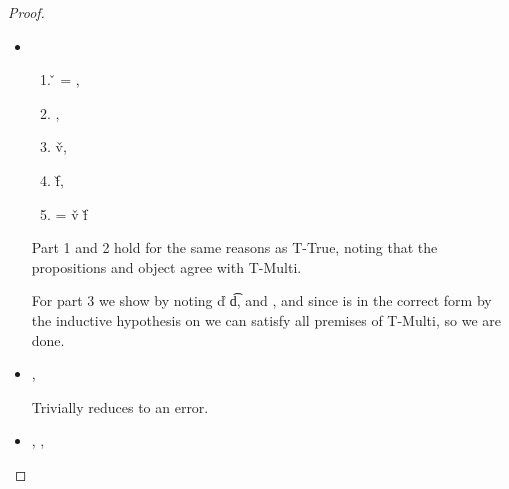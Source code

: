 \begin{lemma}
\begin{proof}
\begin{case}[T-DefMethod]
  \begin{itemize}
    \item[]
      \begin{subcase}[B-DefMethod]
        \ 
        
        \begin{enumerate}[resume]
          \item
       \v{} = { {\disptablep{}}},
          \item
        \opsem {\openv{}}
               {}
               { {\disptable{}}},
          \item
  \opsem {\openv{}}
         {}
         {\v{v}},
          \item
  \opsem {\openv{}}
         {}
         {\v{f}},
          \item
         \disptablep{} = {\extenddisptable {\disptable{}} 
                                {\v{v}}
                                {\v{f}}}
        \end{enumerate}

                                Part 1 and 2 hold for the same reasons as T-True, noting that the propositions
                                and object agree with T-Multi.

For part 3 we show
by noting \judgementtwo {} {\v{d}} {\t{d}},
  and
  , and since \disptable{} is in the correct form by the inductive
  hypothesis on {} we can satisfy all premises of T-Multi, so we are done.


      \end{subcase}

    \item[]
      \begin{subcase}[BE-DefMethod1]
        \opsem {\openv{}}
               {}
               {\errorval{\v{}}},
        \opsem {\openv{}}
                  {\e{}}
                {\errorval{\v{}}}

                Trivially reduces to an error.

      \end{subcase}
    \item[]
      \begin{subcase}[BE-DefMethod2]
        \opsem {\openv{}}
         {}
         { {\disptable{}}},
  \opsem {\openv{}}
         {}
         {\errorval{\v{}}},
        \opsem {\openv{}}
                  {\e{}}
                {\errorval{\v{}}}


\end{subcase}
\end{itemize}
\end{case}
\end{proof}
\end{lemma}
